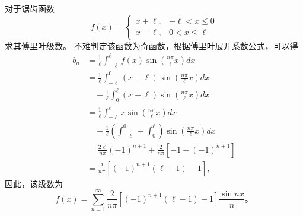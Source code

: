 \begin{examplebox}{
对于锯齿函数
\[  
f(x)= \begin{cases}
  x + \ell,   &  -\ell < x \leq  0 
  \\
  x - \ell,   & 0 < x \leq \ell
\end{cases}
\]
求其傅里叶级数。
}
不难判定该函数为奇函数，根据傅里叶展开系数公式，可以得
\begin{align}
b_n &=   \frac{1}{\ell} \int_{-\ell}^{\ell} f(x) \sin {  \left( \frac{n\pi}{\ell} x \right) } dx \nonumber
\\
&= \frac{1}{\ell} \int_{-\ell}^{0} (x + \ell) \sin {  \left( \frac{n\pi}{\ell} x \right) } dx \nonumber
  \\ & \quad +
 \frac{1}{\ell} \int_{0}^{\ell} (x - \ell) \sin {  \left( \frac{n\pi}{\ell} x \right) } dx \nonumber
 \\ 
 &= \frac{1}{\ell} \int_{-\ell}^{\ell} x \sin {  \left( \frac{n\pi}{\ell} x \right) } dx \nonumber
 \\ & \quad 
 + \frac{1}{\ell} \left( \int_{-\ell}^0 - \int_{0}^{\ell} \right) \sin {  \left( \frac{n\pi}{\ell} x \right) } dx \nonumber
 \\
 & = \frac{2\ell}{n\pi} (-1)^{n+1} + \frac{2}{n\pi} \left[ -1 - (-1)^{n+1}\right] \nonumber
 \\
 & = \frac{2}{n\pi}  \left[ (-1)^{n+1} (\ell -1)  -1 \right] , \nonumber
\end{align}
因此，该级数为
\[
f(x) =  \sum_{n=1}^{\infty} \frac{2}{n\pi}  \left[ (-1)^{n+1} (\ell -1)  -1 \right] \frac{\sin{nx}}{n} \textrm{。}   
\]
\end{examplebox}

